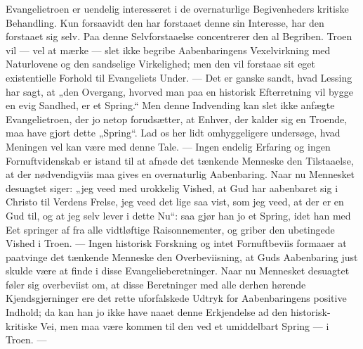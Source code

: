 \documentclass[12pt,a4paper]{book}
\begin{document}
Evangelietroen er uendelig interesseret i de overnaturlige Begivenheders kritiske
Behandling. Kun forsaavidt den har forstaaet denne sin Interesse, har den forstaaet sig
selv. Paa denne Selvforstaaelse concentrerer den al Begriben. Troen vil --- vel at
mærke --- slet ikke begribe Aabenbaringens Vexelvirkning med Naturlovene og den
sandselige Virkelighed; men den vil forstaae sit eget existentielle Forhold til
Evangeliets Under. --- Det er ganske sandt, hvad Lessing har sagt, at „den Overgang,
hvorved man paa en historisk Efterretning vil bygge
en evig Sandhed, er et Spring.“ Men denne Indvending kan slet ikke anfægte
Evangelietroen, der jo netop forudsætter, at Enhver, der kalder sig en Troende, maa have
gjort dette „Spring“. Lad os her lidt omhyggeligere undersøge, hvad Meningen vel kan
være med denne Tale. --- Ingen endelig Erfaring og ingen Fornuftvidenskab er istand til
at afnøde det tænkende Menneske den Tilstaaelse, at der nødvendigviis maa gives en
overnaturlig Aabenbaring. Naar nu Mennesket desuagtet siger: „jeg veed med urokkelig
Vished, at Gud har aabenbaret sig i Christo til Verdens Frelse, jeg veed det lige saa
vist, som jeg veed, at der er en Gud til, og at jeg selv lever i dette Nu“: saa gjør han
jo et Spring, idet han med Eet springer af fra alle vidtløftige Raisonnementer, og
griber den ubetingede Vished i Troen. --- Ingen historisk Forskning og intet
Fornuftbeviis formaaer at paatvinge det tænkende Menneske den Overbeviisning, at Guds
Aabenbaring just skulde være at finde i disse Evangelieberetninger. Naar nu Mennesket
desuagtet føler sig overbeviist om, at disse Beretninger med alle derhen hørende
Kjendsgjerninger ere det rette uforfalskede Udtryk for Aabenbaringens positive Indhold;
da kan han jo ikke have naaet denne Erkjendelse ad den historisk-kritiske Vei, men maa
være kommen til den ved et umiddelbart Spring --- i Troen. ---
\end{document}
